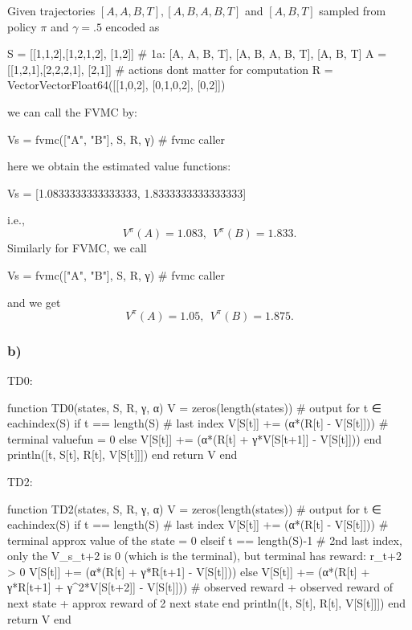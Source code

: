 \documentclass[12pt]{article}
\begin{document}
Given trajectories $[A,A,B,T], [A,B,A,B,T]$ and $[A,B,T]$ sampled from policy $\pi$ and $\gamma = .5$ encoded as
\begin{jllisting}
    S = [[1,1,2],[1,2,1,2], [1,2]] # 1a:  [A, A, B, T], [A, B, A, B, T], [A, B, T]
    A = [[1,2,1],[2,2,2,1], [2,1]] # actions dont matter for computation
    R = Vector{Vector{Float64}}([[1,0,2], [0,1,0,2], [0,2]])
\end{jllisting}
we can call the FVMC by:
\begin{jllisting}
    Vs = fvmc(["A", "B"], S, R, γ)  # fvmc caller
\end{jllisting}
here we obtain the estimated value functions:
\begin{jllisting}
    Vs = [1.0833333333333333, 1.8333333333333333]
\end{jllisting}
i.e., 
\begin{equation*}
    V^{\pi}(A) = 1.083, ~~ V^{\pi}(B) = 1.833.
\end{equation*}
Similarly for FVMC, we call
\begin{jllisting}
    Vs = fvmc(["A", "B"], S, R, γ)  # fvmc caller
\end{jllisting}
and we get
\begin{equation*}
    V^{\pi}(A) = 1.05, ~~ V^{\pi}(B) = 1.875.
\end{equation*}

\subsubsection*{b)}
TD0:
\begin{jllisting}
    function TD0(states, S, R, γ, α)
        V = zeros(length(states)) # output
        for t ∈ eachindex(S)
            if t == length(S) # last index
                V[S[t]] += (α*(R[t] - V[S[t]]))  # terminal valuefun = 0
            else
                V[S[t]] += (α*(R[t] + γ*V[S[t+1]] - V[S[t]]))
            end
            println([t, S[t], R[t], V[S[t]]])
        end
        return V
    end
\end{jllisting}
TD2:
\begin{jllisting}
    function TD2(states, S, R, γ, α)
        V = zeros(length(states)) # output
        for t ∈ eachindex(S)
            if t == length(S) # last index
                V[S[t]] += (α*(R[t] - V[S[t]]))  # terminal approx value of the state = 0
            elseif t == length(S)-1 # 2nd last index, only the V_s_t+2 is 0 (which is the terminal), but terminal has reward: r_t+2 > 0
                V[S[t]] += (α*(R[t] + γ*R[t+1] - V[S[t]]))
            else
                V[S[t]] += (α*(R[t] + γ*R[t+1] + γ^2*V[S[t+2]] - V[S[t]])) # observed reward + observed reward of next state + approx reward of 2 next state 
            end
            println([t, S[t], R[t], V[S[t]]])
        end
        return V
    end
\end{jllisting}
\end{document}

